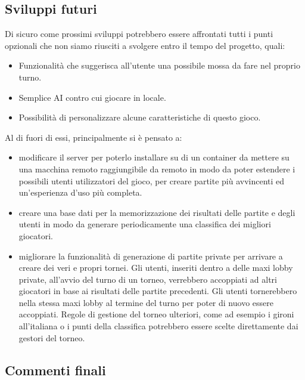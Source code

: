 \subsection{Sviluppi futuri}
Di sicuro come prossimi sviluppi potrebbero essere affrontati tutti i punti opzionali che non siamo riusciti a svolgere entro il tempo del progetto, quali:
\begin{itemize}
    \item Funzionalità che suggerisca all'utente una possibile mossa da fare nel proprio turno.
    \item Semplice AI contro cui giocare in locale.
    \item Possibilità di personalizzare alcune caratteristiche di questo gioco.
\end{itemize}
Al di fuori di essi, principalmente si è pensato a:
\begin{itemize}
    \item modificare il server per poterlo installare su di un container da mettere su una macchina remoto raggiungibile da remoto in modo da poter estendere i possibili utenti utilizzatori del gioco, per creare partite più avvincenti ed un’esperienza d’uso più completa.
    \item creare una base dati per la memorizzazione dei risultati delle partite e degli utenti in modo da generare periodicamente una classifica dei migliori giocatori.
    \item migliorare la funzionalità di generazione di partite private per arrivare a creare dei veri e propri tornei.
    Gli utenti, inseriti dentro a delle maxi lobby private, all’avvio del turno di un torneo, verrebbero accoppiati ad altri giocatori in base ai risultati delle partite precedenti.
    Gli utenti tornerebbero nella stessa maxi lobby al termine del turno per poter di nuovo essere accoppiati.
    Regole di gestione del torneo ulteriori, come ad esempio i gironi all’italiana o i punti della classifica potrebbero essere scelte direttamente dai gestori del torneo.
\end{itemize}

\subsection{Commenti finali}